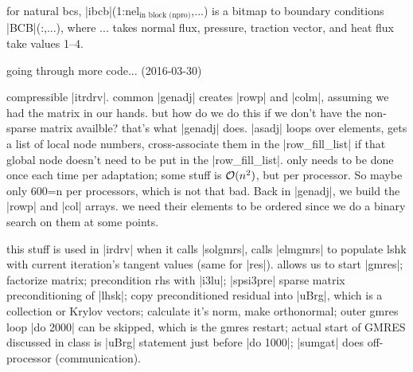\documentclass[11pt]{article}
\begin{document}
for natural bcs, |ibcb|(1:nel$_\text{in block (npro)}$,...) is a bitmap to boundary conditions |BCB|(:,...), where ... takes normal flux, pressure, traction vector, and heat flux take values 1--4.

going through more code... (2016-03-30)

compressible |itrdrv|. common |genadj| creates |rowp| and |colm|, assuming we had the matrix in our hands. but how do we do this if we don't have the non-sparse matrix availble? that's what |genadj| does. |asadj| loops over elements, gets a list of local node numbers, cross-associate them in the |row_fill_list| if that global node doesn't need to be put in the |row_fill_list|. only needs to be done once each time per adaptation; some stuff is $\mathcal{O}(n^2)$, but per processor. So maybe only 600=n per processors, which is not that bad. Back in |genadj|, we build the |rowp| and |col| arrays. we need their elements to be ordered since we do a binary search on them at some points.

this stuff is used in |irdrv| when it calls |solgmrs|, calls |elmgmrs| to populate lshk with current iteration's tangent values (same for |res|). allows us to start |gmres|; factorize matrix; precondition rhs with |i3lu|; |spsi3pre| sparse matrix preconditioning of |lhsk|; copy preconditioned residual into |uBrg|, which is a collection or Krylov vectors; calculate it's norm, make orthonormal; outer gmres loop |do 2000| can be skipped, which is the gmres restart; actual start of GMRES discussed in class is |uBrg| statement just before |do 1000|; |sumgat| does off-processor (communication).
\end{document}
